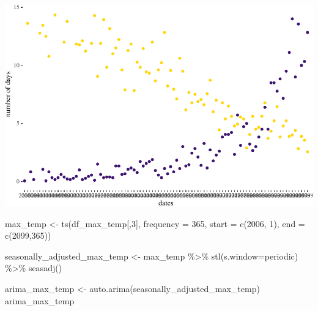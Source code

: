 \documentclass[
  paper=a4,
  ,captions=tableheading
]{scrartcl}
\newenvironment{Shaded}{\begin{snugshade}}{\end{snugshade}}
\newcommand{\AttributeTok}[1]{\textcolor[rgb]{0.77,0.63,0.00}{#1}}
\newcommand{\DecValTok}[1]{\textcolor[rgb]{0.00,0.00,0.81}{#1}}
\newcommand{\FunctionTok}[1]{\textcolor[rgb]{0.00,0.00,0.00}{#1}}
\newcommand{\NormalTok}[1]{#1}
\newcommand{\OtherTok}[1]{\textcolor[rgb]{0.56,0.35,0.01}{#1}}
\newcommand{\SpecialCharTok}[1]{\textcolor[rgb]{0.00,0.00,0.00}{#1}}
\newcommand{\StringTok}[1]{\textcolor[rgb]{0.31,0.60,0.02}{#1}}
\begin{document}
\includegraphics{Haskell_files/figure-latex/unnamed-chunk-67-1.pdf}

\begin{Shaded}
\begin{Highlighting}[]
\NormalTok{max\_temp }\OtherTok{\textless{}{-}} \FunctionTok{ts}\NormalTok{(df\_max\_temp[,}\DecValTok{3}\NormalTok{], }\AttributeTok{frequency =} \DecValTok{365}\NormalTok{, }\AttributeTok{start =} \FunctionTok{c}\NormalTok{(}\DecValTok{2006}\NormalTok{, }\DecValTok{1}\NormalTok{), }\AttributeTok{end =} \FunctionTok{c}\NormalTok{(}\DecValTok{2099}\NormalTok{,}\DecValTok{365}\NormalTok{))}
\end{Highlighting}
\end{Shaded}

\begin{Shaded}
\begin{Highlighting}[]
\NormalTok{seasonally\_adjusted\_max\_temp }\OtherTok{\textless{}{-}}\NormalTok{ max\_temp }\SpecialCharTok{\%\textgreater{}\%} \FunctionTok{stl}\NormalTok{(}\AttributeTok{s.window=}\StringTok{\textquotesingle{}periodic\textquotesingle{}}\NormalTok{) }\SpecialCharTok{\%\textgreater{}\%} \FunctionTok{seasadj}\NormalTok{() }
\end{Highlighting}
\end{Shaded}

\begin{Shaded}
\begin{Highlighting}[]
\NormalTok{arima\_max\_temp }\OtherTok{\textless{}{-}} \FunctionTok{auto.arima}\NormalTok{(seasonally\_adjusted\_max\_temp)}
\NormalTok{arima\_max\_temp}
\end{Highlighting}
\end{Shaded}
\end{document}
